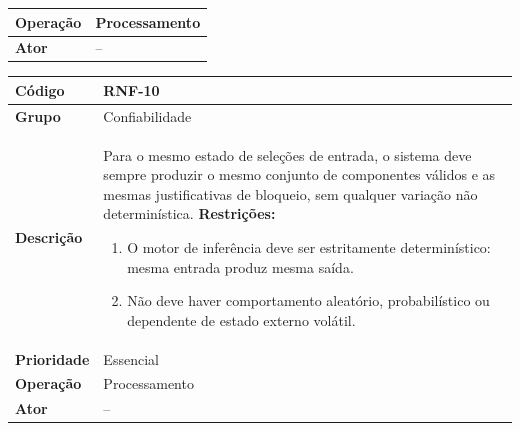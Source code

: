 \begin{quadro}[htb]
\begin{tabular}{|p{3.2cm}|p{11.8cm}|}
    \textbf{Operação}   & Processamento                                                                                                                                                                                                                                                                              \\ \hline
    \textbf{Ator}       & --                                                                                                                                                                                                                                                                                         \\ \hline
  \end{tabular}
\end{quadro}

\FloatBarrier
\begin{quadro}[htb]
  \caption{RNF-10 -- Determinismo do motor de inferência}
  \label{quad:rnf10}
  \begin{tabular}{|p{3.2cm}|p{11.8cm}|}
    \hline
    \textbf{Código}     & RNF-10                                                                           \\ \hline
    \textbf{Grupo}      & Confiabilidade                                                                   \\ \hline
    \textbf{Descrição}  &
    Para o mesmo estado de seleções de entrada, o sistema deve sempre produzir o mesmo conjunto de componentes válidos e as mesmas justificativas de bloqueio, sem qualquer variação não determinística.
    \textbf{Restrições:}
    \begin{enumerate}[nosep,leftmargin=1.2em,topsep=2pt,partopsep=0pt,parsep=0pt,itemsep=1pt]
      \item O motor de inferência deve ser estritamente determinístico: mesma entrada produz mesma saída.
      \item Não deve haver comportamento aleatório, probabilístico ou dependente de estado externo volátil.
    \end{enumerate} \\ \hline
    \textbf{Prioridade} & Essencial                                                                        \\ \hline
    \textbf{Operação}   & Processamento                                                                    \\ \hline
    \textbf{Ator}       & --                                                                               \\ \hline
  \end{tabular}
\end{quadro}

